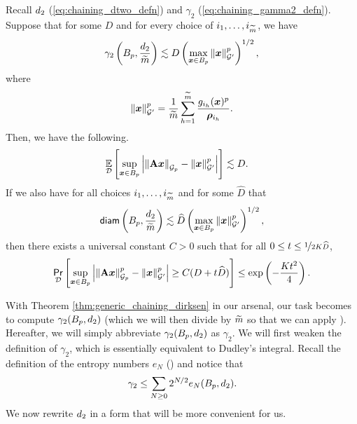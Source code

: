 \documentclass[11pt]{article}
\numberwithin{equation}{section}
\begin{document}
\begin{theorem}[Restatement of Lemma 2.6 due to \citet{jlls23}, $\alpha=2$]
\label{thm:generic_chaining_dirksen}
Recall $d_2$ (\ref{eq:chaining_dtwo_defn}) and $\gamma_2$ (\ref{eq:chaining_gamma2_defn}). Suppose that for some $D$ and for every choice of $i_1,\dots,i_{\widetilde{m}}$, we have
\begin{align*}
    \gamma_2\left(B_p,\frac{d_2}{\widetilde{m}}\right) \lesssim D\left(\max_{\bm{x}\in B_p} \left\lVert \bm{x} \right\rVert_{\mathcal{G}'}^p\right)^{1/2},
\end{align*}
where
\begin{align*}
    \left\lVert \bm{x} \right\rVert_{\mathcal{G}'}^p = \frac{1}{\widetilde{m}}\sum_{h=1}^{\widetilde{m}} \frac{g_{i_h}(\bm{x})^p}{\bm{\rho}_{i_h}}.
\end{align*}
Then, we have the following.
\begin{align*}
    \underset{\mathcal{D}}{\mathbb{E}}\left[\sup_{\bm{x}\in B_p} \left\lvert \left\lVert \mathbf{A}\bm{x} \right\rVert_{\mathcal{G}_{p}}-\left\lVert \bm{x} \right\rVert_{\mathcal{G}'}^p \right\rvert\right] &\lesssim D.
\end{align*}
If we also have for all choices $i_1,\dots,i_{\widetilde{m}}$ and for some $\widehat{D}$ that
\begin{align*}
    \mathsf{diam}\left(B_p, \frac{d_2}{\widetilde{m}}\right) \lesssim \widehat{D}\left(\max_{\bm{x}\in B_p} \left\lVert \bm{x} \right\rVert_{\mathcal{G}'}^p\right)^{1/2},
\end{align*}
then there exists a universal constant $C > 0$ such that for all $0 \le t \le \nicefrac{1}{2K\widehat{D}}$,
\begin{align*}
    \underset{\mathcal{D}}{\mathsf{Pr}}\left[\sup_{\bm{x}\in B_p} \left\lvert \left\lVert \mathbf{A}\bm{x} \right\rVert_{\mathcal{G}_{p}}^p-\left\lVert \bm{x} \right\rVert_{\mathcal{G}'}^p \right\rvert \ge C(D + t\widehat{D})\right] \le \mathrm{exp}\left(-\frac{Kt^2}{4}\right).
\end{align*}
\end{theorem}

With Theorem \ref{thm:generic_chaining_dirksen} in our arsenal, our task becomes to compute $\gamma_2(B_p,d_2)$ (which we will then divide by $\widetilde{m}$ so that we can apply ). Hereafter, we will simply abbreviate $\gamma_2(B_p,d_2)$ as $\gamma_2$. We will first weaken the definition of $\gamma_2$, which is essentially equivalent to Dudley's integral. Recall the definition of the entropy numbers $e_N$ () and notice that
\begin{align*}
    \gamma_2 \le \sum_{N \ge 0} 2^{N/2}e_N(B_{p},d_2). 
\end{align*}
We now rewrite $d_2$ in a form that will be more convenient for us.
\end{document}
